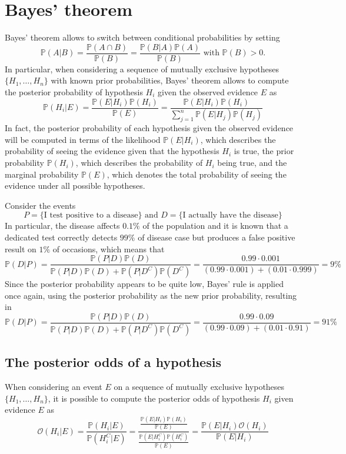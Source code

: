 \documentclass{report}
\begin{document}
\section{Bayes' theorem}
Bayes' theorem allows to switch between conditional probabilities by setting
\[\mathbb{P}(A|B) = \frac{\mathbb{P}(A \cap B)}{\mathbb{P}(B)} = \frac{\mathbb{P}(B|A)\mathbb{P}(A)}{\mathbb{P}(B)} \text{ with $\mathbb{P}(B) > 0$.}\]
In particular, when considering a sequence of mutually exclusive hypotheses $\displaystyle \{H_1, \dots, H_n\}$ with known prior probabilities, Bayes' theorem allows to compute the posterior probability of hypothesis $\displaystyle H_i$ given the observed evidence $\displaystyle E$ as
\[\mathbb{P}(H_i|E) = \frac{\mathbb{P}(E|H_i)\mathbb{P}(H_i)}{\mathbb{P}(E)} = \frac{\mathbb{P}(E|H_i)\mathbb{P}(H_i)}{\sum_{j = 1}^n \mathbb{P}(E|H_j)\mathbb{P}(H_j)}\]
In fact, the posterior probability of each hypothesis given the observed evidence will be computed in terms of the likelihood $\displaystyle \mathbb{P}(E|H_i)$, which describes the probability of seeing the evidence given that the hypothesis $\displaystyle H_i$ is true, the prior probability $\displaystyle \mathbb{P}(H_i)$, which describes the probability of $\displaystyle H_i$ being true, and the marginal probability $\displaystyle \mathbb{P}(E)$, which denotes the total probability of seeing the evidence under all possible hypotheses.
\begin{examplebox}
    Consider the events
    \[P = \{\text{I test positive to a disease}\} \text{ and } D = \{\text{I actually have the disease}\}\]
    In particular, the disease affects $\displaystyle 0.1\%$ of the population and it is known that a dedicated test correctly detects $\displaystyle 99\%$ of disease case but produces a false positive result on $\displaystyle 1\%$ of occasions, which means that
    \[\mathbb{P}(D|P) = \frac{\mathbb{P}(P|D)\mathbb{P}(D)}{\mathbb{P}(P|D)\mathbb{P}(D) + \mathbb{P}(P|D^C)\mathbb{P}(D^C)} = \frac{0.99 \cdot 0.001}{(0.99 \cdot 0.001) + (0.01 \cdot 0.999)} = 9\%\]
    Since the posterior probability appears to be quite low, Bayes' rule is applied once again, using the posterior probability as the new prior probability, resulting in
    \[\mathbb{P}(D|P) = \frac{\mathbb{P}(P|D)\mathbb{P}(D)}{\mathbb{P}(P|D)\mathbb{P}(D) + \mathbb{P}(P|D^C)\mathbb{P}(D^C)} = \frac{0.99 \cdot 0.09}{(0.99 \cdot 0.09) + (0.01 \cdot 0.91)} = 91\%\]
\end{examplebox}
\subsection{The posterior odds of a hypothesis}
When considering an event $\displaystyle E$ on a sequence of mutually exclusive hypotheses $\displaystyle \{H_1, \dots, H_n\}$, it is possible to compute the posterior odds of hypothesis $\displaystyle H_i$ given evidence $\displaystyle E$ as
\[\mathcal{O}(H_i|E) = \frac{\mathbb{P}(H_i|E)}{\mathbb{P}(H_i^C|E)} = \frac{\frac{\mathbb{P}(E|H_i)\mathbb{P}(H_i)}{\mathbb{P}(E)}}{\frac{\mathbb{P}(E|H_i^C)\mathbb{P}(H_i^C)}{\mathbb{P}(E)}} = \frac{\mathbb{P}(E|H_i)\mathcal{O}(H_i)}{\mathbb{P}(E|H_i)}\]
\end{document}
